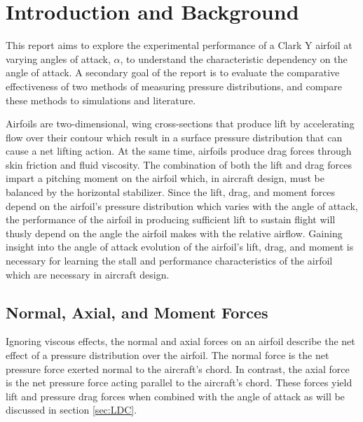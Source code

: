 \documentclass[runningheads]{llncs}
\begin{document}


\section{Introduction and Background}\label{sec:introduction_and_background}

\noindent
This report aims to explore the experimental performance of a Clark Y airfoil at varying angles of attack, $\alpha$, to understand the characteristic dependency on the angle of attack. A secondary goal of the report is to evaluate the comparative effectiveness of two methods of measuring pressure distributions, and compare these methods to simulations and literature.\newline

\noindent
Airfoils are two-dimensional, wing cross-sections that produce lift by accelerating flow over their contour which result in a surface pressure distribution that can cause a net lifting action. At the same time, airfoils produce drag forces through skin friction and fluid viscosity. The combination of both the lift and drag forces impart a pitching moment on the airfoil which, in aircraft design, must be balanced by the horizontal stabilizer. Since the lift, drag, and moment forces depend on the airfoil's pressure distribution which varies with the angle of attack, the performance of the airfoil in producing sufficient lift to sustain flight will thusly depend on the angle the airfoil makes with the relative airflow. Gaining insight into the angle of attack evolution of the airfoil's lift, drag, and moment is necessary for learning the stall and performance characteristics of the airfoil which are necessary in aircraft design.\newline

\subsection{Normal, Axial, and Moment Forces}

\noindent
Ignoring viscous effects, the normal and axial forces on an airfoil describe the net effect of a pressure distribution over the airfoil. The normal force is the net pressure force exerted normal to the aircraft's chord. In contrast, the axial force is the net pressure force acting parallel to the aircraft's chord. These forces yield lift and pressure drag forces when combined with the angle of attack as will be discussed in section \ref{sec:LDC}.\newline
\end{document}
